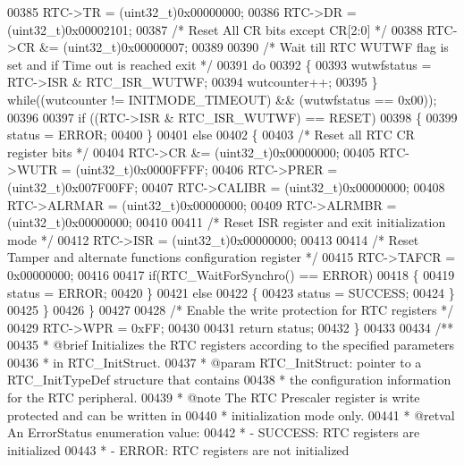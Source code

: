 \begin{DoxyCode}
00385     RTC->TR = (uint32\_t)0x00000000;
00386     RTC->DR = (uint32\_t)0x00002101;
00387     \textcolor{comment}{/* Reset All CR bits except CR[2:0] */}
00388     RTC->CR &= (uint32\_t)0x00000007;
00389 
00390     \textcolor{comment}{/* Wait till RTC WUTWF flag is set and if Time out is reached exit */}
00391     \textcolor{keywordflow}{do}
00392     \{
00393       wutwfstatus = RTC->ISR & RTC_ISR_WUTWF;
00394       wutcounter++;
00395     \} \textcolor{keywordflow}{while}((wutcounter != INITMODE_TIMEOUT) && (wutwfstatus == 0x00));
00396 
00397     \textcolor{keywordflow}{if} ((RTC->ISR & RTC_ISR_WUTWF) == RESET)
00398     \{
00399       status = ERROR;
00400     \}
00401     \textcolor{keywordflow}{else}
00402     \{
00403       \textcolor{comment}{/* Reset all RTC CR register bits */}
00404       RTC->CR &= (uint32\_t)0x00000000;
00405       RTC->WUTR = (uint32\_t)0x0000FFFF;
00406       RTC->PRER = (uint32\_t)0x007F00FF;
00407       RTC->CALIBR = (uint32\_t)0x00000000;
00408       RTC->ALRMAR = (uint32\_t)0x00000000;
00409       RTC->ALRMBR = (uint32\_t)0x00000000;
00410 
00411       \textcolor{comment}{/* Reset ISR register and exit initialization mode */}
00412       RTC->ISR = (uint32\_t)0x00000000;
00413 
00414       \textcolor{comment}{/* Reset Tamper and alternate functions configuration register */}
00415       RTC->TAFCR = 0x00000000;
00416 
00417       \textcolor{keywordflow}{if}(RTC\_WaitForSynchro() == ERROR)
00418       \{
00419         status = ERROR;
00420       \}
00421       \textcolor{keywordflow}{else}
00422       \{
00423         status = SUCCESS;
00424       \}
00425     \}
00426   \}
00427 
00428   \textcolor{comment}{/* Enable the write protection for RTC registers */}
00429   RTC->WPR = 0xFF;
00430 
00431   \textcolor{keywordflow}{return} status;
00432 \}
00433 
00434 \textcolor{comment}{/**}
00435 \textcolor{comment}{  * @brief  Initializes the RTC registers according to the specified parameters }
00436 \textcolor{comment}{  *         in RTC\_InitStruct.}
00437 \textcolor{comment}{  * @param  RTC\_InitStruct: pointer to a RTC\_InitTypeDef structure that contains }
00438 \textcolor{comment}{  *         the configuration information for the RTC peripheral.}
00439 \textcolor{comment}{  * @note   The RTC Prescaler register is write protected and can be written in }
00440 \textcolor{comment}{  *         initialization mode only.  }
00441 \textcolor{comment}{  * @retval An ErrorStatus enumeration value:}
00442 \textcolor{comment}{  *          - SUCCESS: RTC registers are initialized}
00443 \textcolor{comment}{  *          - ERROR: RTC registers are not initialized  }

\end{DoxyCode}
